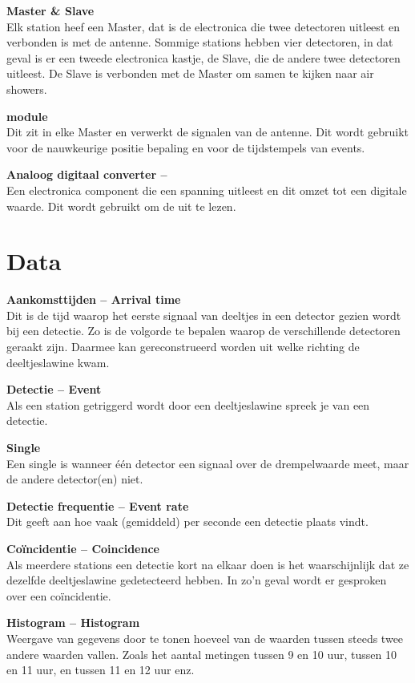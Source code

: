\textbf{Master \& Slave} \\
Elk station heef een Master, dat is de \hisparc electronica die twee
detectoren uitleest en verbonden is met de \gps antenne. Sommige
stations hebben vier detectoren, in dat geval is er een tweede \hisparc
electronica kastje, de Slave, die de andere twee detectoren uitleest. De
Slave is verbonden met de Master om samen te kijken naar air showers.

\textbf{\gps module} \\
Dit zit in elke Master en verwerkt de signalen van de \gps antenne. Dit
wordt gebruikt voor de nauwkeurige positie bepaling en voor de
tijdstempels van events.

\textbf{Analoog digitaal converter -- \adc} \\
Een electronica component die een spanning uitleest en dit omzet tot een
digitale waarde. Dit wordt gebruikt om de \pmts uit te lezen.


\section{Data}

\textbf{Aankomsttijden -- Arrival time} \\
Dit is de tijd waarop het eerste signaal van deeltjes in een detector
gezien wordt bij een detectie. Zo is de volgorde te bepalen waarop de
verschillende detectoren geraakt zijn. Daarmee kan gereconstrueerd worden
uit welke richting de deeltjeslawine kwam.

\textbf{Detectie -- Event} \\
Als een station getriggerd wordt door een deeltjeslawine spreek je van
een detectie.

\textbf{Single} \\
Een single is wanneer \'e\'en detector een signaal over de drempelwaarde meet,
maar de andere detector(en) niet.

\textbf{Detectie frequentie -- Event rate} \\
Dit geeft aan hoe vaak (gemiddeld) per seconde een detectie plaats vindt.

\textbf{Coïncidentie -- Coincidence} \\
Als meerdere stations een detectie kort na elkaar doen is het
waarschijnlijk dat ze dezelfde deeltjeslawine gedetecteerd hebben. In
zo'n geval wordt er gesproken over een coïncidentie.

\textbf{Histogram -- Histogram} \\
Weergave van gegevens door te tonen hoeveel van de waarden tussen steeds
twee andere waarden vallen. Zoals het aantal metingen tussen 9 en 10
uur, tussen 10 en 11 uur, en tussen 11 en 12 uur enz.

